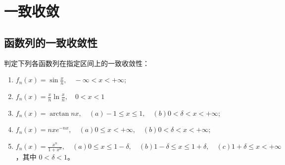 \chapter{一致收敛}
\section{函数列的一致收敛性}
\begin{problem}
    判定下列各函数列在指定区间上的一致收敛性：
    \begin{enumerate}
        \item \(f_n(x) = \sin \frac{x}{n}, \quad -\infty <
            x < +\infty\);
        \item \(f_n(x) = \frac{x}{n} \ln \frac{x}{n}, \quad
            0 < x < 1\)
        \item \(f_n(x) = \arctan nx, \quad (a) - 1 \leq x
                \leq 1, \quad (b) 0 <
            \delta < x < +\infty\);
        \item \(f_n(x) = nxe^{-nx}, \quad (a) 0 \leq x <
                +\infty, \quad (b) 0 <
            \delta < x < +\infty\);
        \item \(f_n(x) = \frac{x^n}{1 + x^n}, \quad (a) 0
                \leq x \leq 1 -
                \delta, \quad (b) 1 - \delta \leq x \leq 1 + \delta,
            \quad (c) 1 + \delta \leq x < +\infty\)，其中 \(0 <
            \delta < 1\)。
    \end{enumerate}
\end{problem}

